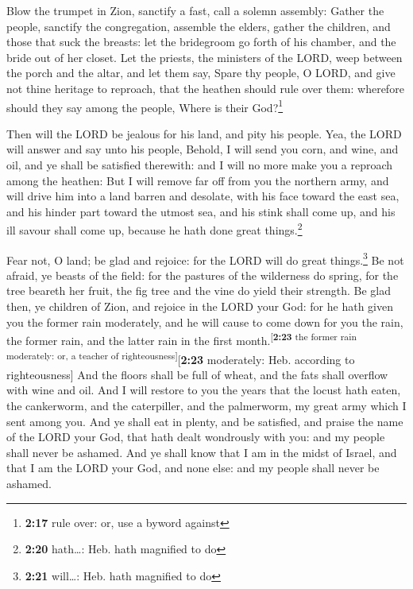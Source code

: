  Blow the trumpet in Zion, sanctify a fast, call a solemn
assembly:  Gather the people, sanctify the congregation,
assemble the elders, gather the children, and those that suck the
breasts: let the bridegroom go forth of his chamber, and the bride out
of her closet.  Let the priests, the ministers of the
LORD, weep between the porch and the altar, and let them say, Spare thy
people, O LORD, and give not thine heritage to reproach, that the
heathen should rule over them: wherefore should they say among the
people, Where is their God?\footnote{\textbf{2:17} rule over: or, use a
  byword against}

 Then will the LORD be jealous for his land, and pity his
people.  Yea, the LORD will answer and say unto his
people, Behold, I will send you corn, and wine, and oil, and ye shall be
satisfied therewith: and I will no more make you a reproach among the
heathen:  But I will remove far off from you the northern
army, and will drive him into a land barren and desolate, with his face
toward the east sea, and his hinder part toward the utmost sea, and his
stink shall come up, and his ill savour shall come up, because he hath
done great things.\footnote{\textbf{2:20} hath\ldots: Heb. hath
  magnified to do}

 Fear not, O land; be glad and rejoice: for the LORD will
do great things.\footnote{\textbf{2:21} will\ldots: Heb. hath magnified
  to do}  Be not afraid, ye beasts of the field: for the
pastures of the wilderness do spring, for the tree beareth her fruit,
the fig tree and the vine do yield their strength.  Be
glad then, ye children of Zion, and rejoice in the LORD your God: for he
hath given you the former rain moderately, and he will cause to come
down for you the rain, the former rain, and the latter rain in the first
month.\textsuperscript{{[}\textbf{2:23} the former rain moderately: or,
a teacher of righteousness{]}}{[}\textbf{2:23} moderately: Heb.
according to righteousness{]}  And the floors shall be
full of wheat, and the fats shall overflow with wine and oil.
 And I will restore to you the years that the locust hath
eaten, the cankerworm, and the caterpiller, and the palmerworm, my great
army which I sent among you.  And ye shall eat in plenty,
and be satisfied, and praise the name of the LORD your God, that hath
dealt wondrously with you: and my people shall never be ashamed.
 And ye shall know that I am in the midst of Israel, and
that I am the LORD your God, and none else: and my people shall never be
ashamed.

